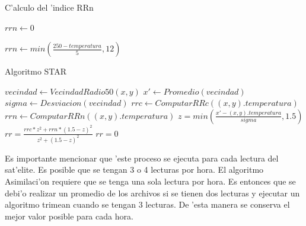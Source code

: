   \begin{algorithm}
  \caption{C'alculo del 'indice RRn}

  \begin{algorithmic}
	  \STATE $rrn \gets 0$
  \ELSE
	  
	  \STATE $rrn \gets min(\frac{250-temperatura}{5}, 12)$ 
	  
  \ENDIF 
  \end{algorithmic}
  \end{algorithm}

  \begin{algorithm}
  \caption{Algoritmo STAR}

  \begin{algorithmic}
      \STATE $vecindad \gets VecindadRadio50(x,y)$
      \STATE $x' \gets Promedio(vecindad)$
      \STATE $sigma \gets Desviacion(vecindad)$  
      \STATE $rrc \gets ComputarRRc((x,y).temperatura)$
      \STATE $rrn \gets ComputarRRn((x,y).temperatura)$
      \STATE $z = min(\frac{ x'-(x,y).temperatura}{sigma}, 1.5)$
	\STATE $rr = \frac{rrc*z^2 + rrn*(1.5-z)^2}{z^2+ (1.5-z)^2}$
      \ELSE	  
	\STATE $rr = 0$   
      \ENDIF
    \ENDFOR
  \end{algorithmic}
  \end{algorithm}

Es importante mencionar que 'este proceso se ejecuta para cada lectura del sat'elite. Es posible que se tengan 3 o 4 lecturas por hora. El algoritmo 
Asimilaci'on requiere que se tenga una sola lectura por hora. Es entonces que se debi'o realizar un promedio de los archivos si se tienen dos lecturas y 
ejecutar un algoritmo trimean cuando se tengan 3 lecturas. De 'esta manera se conserva el mejor valor posible para cada hora.


